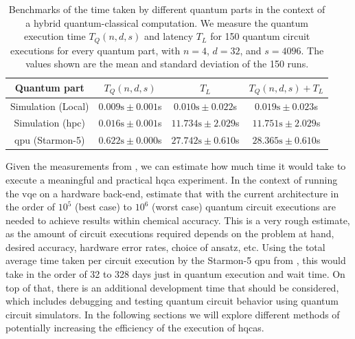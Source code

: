 \begin{table}[ht]
    \centering
    {\renewcommand{\arraystretch}{1.35}
        \begin{tabular}{ c|c|c|c }
            Quantum part & $T_Q(n, d, s)$ & $T_L$ & $T_Q(n, d, s) + T_L$ \\
            \hline
            Simulation (Local) & $0.009\text{s} \pm 0.001$s & $0.010 \text{s} \pm 0.022$s & $0.019 \text{s} \pm 0.023$s \\
            Simulation (\gls{hpc}) & $0.016\text{s} \pm 0.001$s & $11.734\text{s} \pm 2.029$s & $11.751\text{s} \pm 2.029$s \\
            \gls{qpu} (Starmon-5) & $0.622\text{s} \pm 0.000$s & $27.742\text{s} \pm 0.610$s & $28.365\text{s} \pm 0.610$s \\
        \end{tabular}
    }
    \caption[Benchmarks of the time taken by different quantum parts in the context of a hybrid quantum-classical computation.]{
        Benchmarks of the time taken by different quantum parts in the context of a hybrid quantum-classical computation.
        We measure the quantum execution time $T_Q(n, d, s)$ and latency $T_L$ for 150 quantum circuit executions for every quantum part, with $n = 4$, $d = 32$, and $s = 4096$.
        The values shown are the mean and standard deviation of the 150 runs.
    }
    \label{table:baseline-benchmark}
\end{table}

Given the measurements from , we can estimate how much time it would take to execute a meaningful and practical \gls{hqca} experiment.
In the context of running the \gls{vqe} on a hardware back-end, \textcite{kandala2017hardware} estimate that with the current architecture in the order of $10^5$ (best case) to $10^6$ (worst case) quantum circuit executions are needed to achieve results within chemical accuracy.
This is a very rough estimate, as the amount of circuit executions required depends on the problem at hand, desired accuracy, hardware error rates, choice of ansatz, etc.
Using the total average time taken per circuit execution by the Starmon-5 \gls{qpu} from , this would take in the order of 32 to 328 days just in quantum execution and wait time.
On top of that, there is an additional development time that should be considered, which includes debugging and testing quantum circuit behavior using quantum circuit simulators.
In the following sections we will explore different methods of potentially increasing the efficiency of the execution of \glspl{hqca}.

